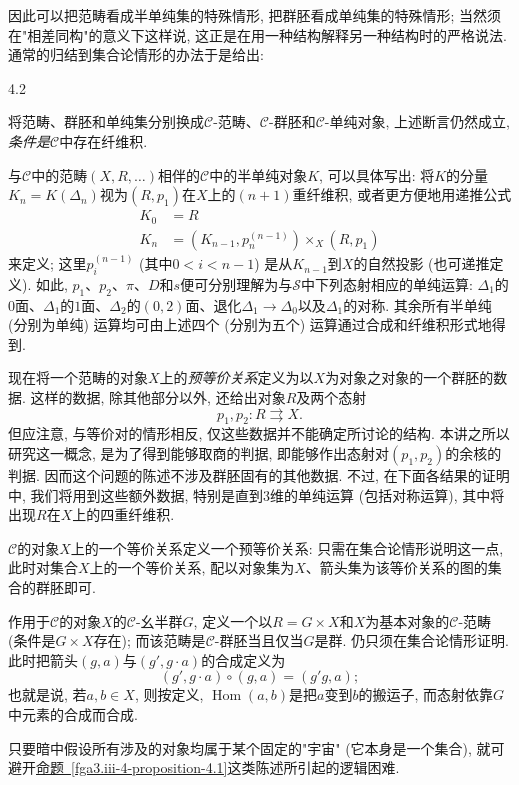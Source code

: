 \par{}因此可以把范畴看成半单纯集的特殊情形, 把群胚看成单纯集的特殊情形; 当然须在"相差同构"的意义下这样说, 这正是在用一种结构解释另一种结构时的严格说法. 通常的归结到集合论情形的办法于是给出:
\begin{corollary}{4.2}\label{fga3.iii-4-corollary-4.2}\skipsinglepar
\par{}将范畴、群胚和单纯集分别换成\(\mathcal {C}\)-范畴、\(\mathcal {C}\)-群胚和\(\mathcal {C}\)-单纯对象, 上述断言仍然成立, \emph{条件是}\(\mathcal {C}\)中存在纤维积.
\end{corollary}
\par{}与\(\mathcal {C}\)中的范畴\((X,R,\ldots )\)相伴的\(\mathcal {C}\)中的半单纯对象\(K\), 可以具体写出: 将\(K\)的分量\(K_n=K(\Delta _n)\)视为\((R,p_1)\)在\(X\)上的\((n+1)\)重纤维积, 或者更方便地用递推公式\[     
\begin {aligned}       K_0 &= R     \\K_n &= (K_{n-1},p_n^{(n-1)})\times _X(R,p_1)     
\end {aligned}   \]来定义; 这里\(p_i^{(n-1)}\) (其中\(0<i<n-1\)) 是从\(K_{n-1}\)到\(X\)的自然投影 (也可递推定义). 如此, \(p_1\)、\(p_2\)、\(\pi \)、\(D\)和\(s\)便可分别理解为与\(\mathcal {S}\)中下列态射相应的单纯运算: \(\Delta _1\)的\(0\)面、\(\Delta _1\)的\(1\)面、\(\Delta _2\)的\((0,2)\)面、退化\(\Delta _1\to \Delta _0\)以及\(\Delta _1\)的对称. 其余所有半单纯 (分别为单纯) 运算均可由上述四个 (分别为五个) 运算通过合成和纤维积形式地得到.
\par{}现在将一个范畴的对象\(X\)上的\emph{预等价关系}定义为以\(X\)为对象之对象的一个群胚的数据. 这样的数据, 除其他部分以外, 还给出对象\(R\)及两个态射\[     p_1,p_2\colon  R\rightrightarrows  X.\] 但应注意, 与等价对的情形相反, 仅这些数据并不能确定所讨论的结构. 本讲之所以研究这一概念, 是为了得到能够取商的判据, 即能够作出态射对\((p_1,p_2)\)的余核的判据. 因而这个问题的陈述不涉及群胚固有的其他数据. 不过, 在下面各结果的证明中, 我们将用到这些额外数据, 特别是直到\(3\)维的单纯运算 (包括对称运算), 其中将出现\(R\)在\(X\)上的四重纤维积.
\par{}\(\mathcal {C}\)的对象\(X\)上的一个等价关系定义一个预等价关系: 只需在集合论情形说明这一点, 此时对集合\(X\)上的一个等价关系, 配以对象集为\(X\)、箭头集为该等价关系的图的集合的群胚即可.
\par{}作用于\(\mathcal {C}\)的对象\(X\)的\(\mathcal {C}\)-幺半群\(G\), 定义一个以\(R=G\times  X\)和\(X\)为基本对象的\(\mathcal {C}\)-范畴 (条件是\(G\times  X\)存在); 而该范畴是\(\mathcal {C}\)-群胚当且仅当\(G\)是群. 仍只须在集合论情形证明. 此时把箭头\((g,a)\)与\((g',g\cdot  a)\)的合成定义为\[     (g',g\cdot  a) \circ  (g,a)     = (g'g,a);\] 也就是说, 若\(a,b\in  X\), 则按定义, \(\operatorname {Hom}(a,b)\)是把\(a\)变到\(b\)的搬运子, 而态射依靠\(G\)中元素的合成而合成.
\begin{remark}{}\label{fga3.iii-4-remark}\skipsinglepar
\par{}只要暗中假设所有涉及的对象均属于某个固定的"宇宙" (它本身是一个集合), 就可避开\hyperref[fga3.iii-4-proposition-4.1]{命题~\ref*{fga3.iii-4-proposition-4.1}}这类陈述所引起的逻辑困难.
\end{remark}
